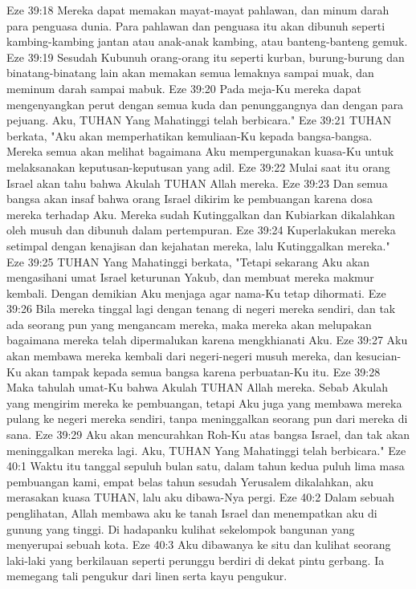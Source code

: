 Eze 39:18  Mereka dapat memakan mayat-mayat pahlawan, dan minum darah para penguasa dunia. Para pahlawan dan penguasa itu akan dibunuh seperti kambing-kambing jantan atau anak-anak kambing, atau banteng-banteng gemuk.
Eze 39:19  Sesudah Kubunuh orang-orang itu seperti kurban, burung-burung dan binatang-binatang lain akan memakan semua lemaknya sampai muak, dan meminum darah sampai mabuk.
Eze 39:20  Pada meja-Ku mereka dapat mengenyangkan perut dengan semua kuda dan penunggangnya dan dengan para pejuang. Aku, TUHAN Yang Mahatinggi telah berbicara."
Eze 39:21  TUHAN berkata, "Aku akan memperhatikan kemuliaan-Ku kepada bangsa-bangsa. Mereka semua akan melihat bagaimana Aku mempergunakan kuasa-Ku untuk melaksanakan keputusan-keputusan yang adil.
Eze 39:22  Mulai saat itu orang Israel akan tahu bahwa Akulah TUHAN Allah mereka.
Eze 39:23  Dan semua bangsa akan insaf bahwa orang Israel dikirim ke pembuangan karena dosa mereka terhadap Aku. Mereka sudah Kutinggalkan dan Kubiarkan dikalahkan oleh musuh dan dibunuh dalam pertempuran.
Eze 39:24  Kuperlakukan mereka setimpal dengan kenajisan dan kejahatan mereka, lalu Kutinggalkan mereka."
Eze 39:25  TUHAN Yang Mahatinggi berkata, "Tetapi sekarang Aku akan mengasihani umat Israel keturunan Yakub, dan membuat mereka makmur kembali. Dengan demikian Aku menjaga agar nama-Ku tetap dihormati.
Eze 39:26  Bila mereka tinggal lagi dengan tenang di negeri mereka sendiri, dan tak ada seorang pun yang mengancam mereka, maka mereka akan melupakan bagaimana mereka telah dipermalukan karena mengkhianati Aku.
Eze 39:27  Aku akan membawa mereka kembali dari negeri-negeri musuh mereka, dan kesucian-Ku akan tampak kepada semua bangsa karena perbuatan-Ku itu.
Eze 39:28  Maka tahulah umat-Ku bahwa Akulah TUHAN Allah mereka. Sebab Akulah yang mengirim mereka ke pembuangan, tetapi Aku juga yang membawa mereka pulang ke negeri mereka sendiri, tanpa meninggalkan seorang pun dari mereka di sana.
Eze 39:29  Aku akan mencurahkan Roh-Ku atas bangsa Israel, dan tak akan meninggalkan mereka lagi. Aku, TUHAN Yang Mahatinggi telah berbicara."
Eze 40:1  Waktu itu tanggal sepuluh bulan satu, dalam tahun kedua puluh lima masa pembuangan kami, empat belas tahun sesudah Yerusalem dikalahkan, aku merasakan kuasa TUHAN, lalu aku dibawa-Nya pergi.
Eze 40:2  Dalam sebuah penglihatan, Allah membawa aku ke tanah Israel dan menempatkan aku di gunung yang tinggi. Di hadapanku kulihat sekelompok bangunan yang menyerupai sebuah kota.
Eze 40:3  Aku dibawanya ke situ dan kulihat seorang laki-laki yang berkilauan seperti perunggu berdiri di dekat pintu gerbang. Ia memegang tali pengukur dari linen serta kayu pengukur.
